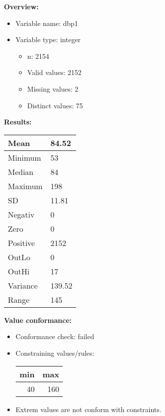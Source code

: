 \documentclass[
]{article}
\providecommand{\tightlist}{%
  \setlength{\itemsep}{0pt}\setlength{\parskip}{0pt}}
\begin{document}
\textbf{Overview:}

\begin{itemize}
\tightlist
\item
  Variable name: dbp1
\item
  Variable type: integer

  \begin{itemize}
  \tightlist
  \item
    n: 2154
  \item
    Valid values: 2152
  \item
    Missing values: 2
  \item
    Distinct values: 75
  \end{itemize}
\end{itemize}

\textbf{Results:}\\

\begin{table}[H]
\centering
\begin{tabular}{l|l}
\hline
Mean & 84.52\\
\hline
Minimum & 53\\
\hline
Median & 84\\
\hline
Maximum & 198\\
\hline
SD & 11.81\\
\hline
Negativ & 0\\
\hline
Zero & 0\\
\hline
Positive & 2152\\
\hline
OutLo & 0\\
\hline
OutHi & 17\\
\hline
Variance & 139.52\\
\hline
Range & 145\\
\hline
\end{tabular}
\end{table}

\textbf{Value conformance:}

\begin{itemize}
\tightlist
\item
  Conformance check: failed
\item
  Constraining values/rules:

  \begin{table}[H]
  \centering
  \begin{tabular}{r|r}
  \hline
  \textbf{min} & \textbf{max}\\
  \hline
  40 & 160\\
  \hline
  \end{tabular}
  \end{table}
\item
  Extrem values are not conform with constraints.
\end{itemize}
\end{document}
